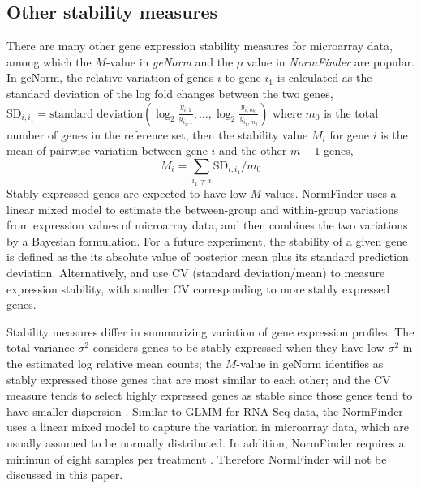 \documentclass[11pt, a4paper]{article}
\begin{document}
\subsection{Other stability measures}\label{subsection:OtherStabilityMeasure}
There are many other gene expression stability measures for microarray data, among which the $M$-value in \textit{geNorm} \citep{vandesompele2002accurate} and the $\rho$ value in \textit{NormFinder} \citep{andersen2004normalization} are popular. In geNorm, the relative variation of genes $i$ to gene $i_1$ is calculated as the standard deviation of the log fold changes between the two genes, $\text{SD}_{i, i_1} = \text{standard deviation}(\log_2 \frac{y_{i,1}}{y_{i_1,1}}, \ldots, \log_2 \frac{y_{i,m_0}}{y_{i_1,m_0}})$ where $m_0$ is the total number of genes in the reference set; then the stability value $M_i$ for gene $i$ is the mean of pairwise variation between gene $i$ and the other $m-1$ genes, 
\begin{equation}\label{eq:vvalue}
M_i = \sum_{i_1 \neq i}\text{SD}_{i, i_1}/m_0
\end{equation}
Stably expressed genes are expected to have low $M$-values. NormFinder uses a linear mixed model to estimate the between-group and within-group variations from expression values of microarray data, and then combines the two variations by a Bayesian formulation. For a future experiment, the stability of a given gene is defined as the its absolute value of posterior mean plus its standard prediction deviation. Alternatively, \cite{czechowski2005genome} and \cite{dekkers2012identification} use CV (standard deviation/mean) to measure expression stability, with smaller CV  corresponding to more stably expressed genes.
	
Stability measures differ in summarizing variation of gene expression profiles. The total variance ${\sigma}^2$ considers genes to be stably expressed when they have low ${\sigma}^2$ in the estimated log relative mean
counts; the $M$-value in geNorm identifies as stably
expressed those genes that are most similar to each other; and the CV measure
\citep{czechowski2005genome} tends to select highly expressed genes as stable
since those genes tend to have smaller dispersion \citep{hruz2011refgenes}. 
Similar to GLMM for RNA-Seq data, the NormFinder uses a linear mixed model to capture the variation in microarray data, which are usually assumed to be normally distributed. In addition, NormFinder requires a minimun of eight samples per treatment \citep{andersen2004normalization}. Therefore NormFinder will not be discussed in this paper. %
\end{document}
